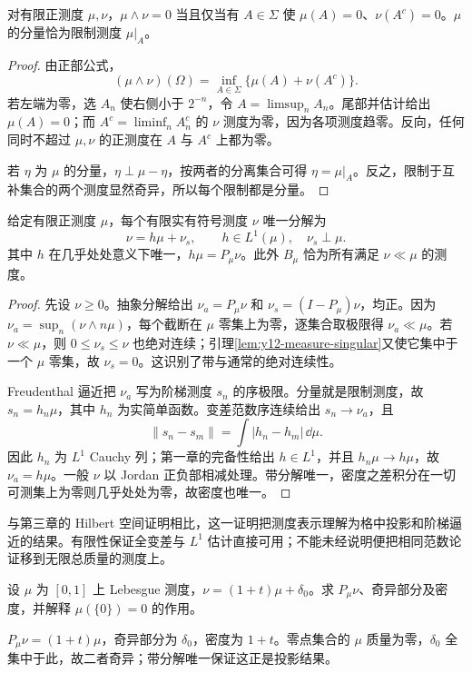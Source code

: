 \begin{lemma}[格不交即测度互相奇异]\label{lem:y12-measure-singular}
对有限正测度 $\mu,\nu$，$\mu\wedge\nu=0$ 当且仅当有 $A\in\Sigma$ 使 $\mu(A)=0$、$\nu(A^c)=0$。$\mu$ 的分量恰为限制测度 $\mu|_A$。
\end{lemma}
\begin{proof}
由正部公式，
\[
 (\mu\wedge\nu)(\Omega)=\inf_{A\in\Sigma}\{\mu(A)+\nu(A^c)\}.
\]
若左端为零，选 $A_n$ 使右侧小于 $2^{-n}$，令 $A=\limsup_nA_n$。尾部并估计给出 $\mu(A)=0$；而 $A^c=\liminf_nA_n^c$ 的 $\nu$ 测度为零，因为各项测度趋零。反向，任何同时不超过 $\mu,\nu$ 的正测度在 $A$ 与 $A^c$ 上都为零。

若 $\eta$ 为 $\mu$ 的分量，$\eta\perp\mu-\eta$，按两者的分离集合可得 $\eta=\mu|_A$。反之，限制于互补集合的两个测度显然奇异，所以每个限制都是分量。
\end{proof}

\begin{theorem}\label{thm:y12-measure-representation}
给定有限正测度 $\mu$，每个有限实有符号测度 $\nu$ 唯一分解为
\[
 \nu=h\mu+\nu_s,\qquad h\in L^1(\mu),\quad \nu_s\perp\mu.
\]
其中 $h$ 在几乎处处意义下唯一，$h\mu=P_\mu\nu$。此外 $B_\mu$ 恰为所有满足 $\nu\ll\mu$ 的测度。
\end{theorem}
\begin{proof}
先设 $\nu\ge0$。抽象分解给出 $\nu_a=P_\mu\nu$ 和 $\nu_s=(I-P_\mu)\nu$，均正。因为 $\nu_a=\sup_n(\nu\wedge n\mu)$，每个截断在 $\mu$ 零集上为零，逐集合取极限得 $\nu_a\ll\mu$。若 $\nu\ll\mu$，则 $0\le\nu_s\le\nu$ 也绝对连续；引理\ref{lem:y12-measure-singular}又使它集中于一个 $\mu$ 零集，故 $\nu_s=0$。这识别了带与通常的绝对连续性。

Freudenthal 逼近把 $\nu_a$ 写为阶梯测度 $s_n$ 的序极限。分量就是限制测度，故 $s_n=h_n\mu$，其中 $h_n$ 为实简单函数。变差范数序连续给出 $s_n\to\nu_a$，且
\[
 \|s_n-s_m\|=\int|h_n-h_m|\,\dd\mu.
\]
因此 $h_n$ 为 $L^1$ Cauchy 列；第一章的完备性给出 $h\in L^1$，并且 $h_n\mu\to h\mu$，故 $\nu_a=h\mu$。一般 $\nu$ 以 Jordan 正负部相减处理。带分解唯一，密度之差积分在一切可测集上为零则几乎处处为零，故密度也唯一。
\end{proof}

与第三章的 Hilbert 空间证明相比，这一证明把测度表示理解为格中投影和阶梯逼近的结果。有限性保证全变差与 $L^1$ 估计直接可用；不能未经说明便把相同范数论证移到无限总质量的测度上。

\begin{exercise}[显式分解]\label{ex:y12-concrete-lebesgue}
设 $\mu$ 为 $[0,1]$ 上 Lebesgue 测度，$\nu=(1+t)\mu+\delta_0$。求 $P_\mu\nu$、奇异部分及密度，并解释 $\mu(\{0\})=0$ 的作用。
\end{exercise}
\begin{solution}
$P_\mu\nu=(1+t)\mu$，奇异部分为 $\delta_0$，密度为 $1+t$。零点集合的 $\mu$ 质量为零，$\delta_0$ 全集中于此，故二者奇异；带分解唯一保证这正是投影结果。
\end{solution}

